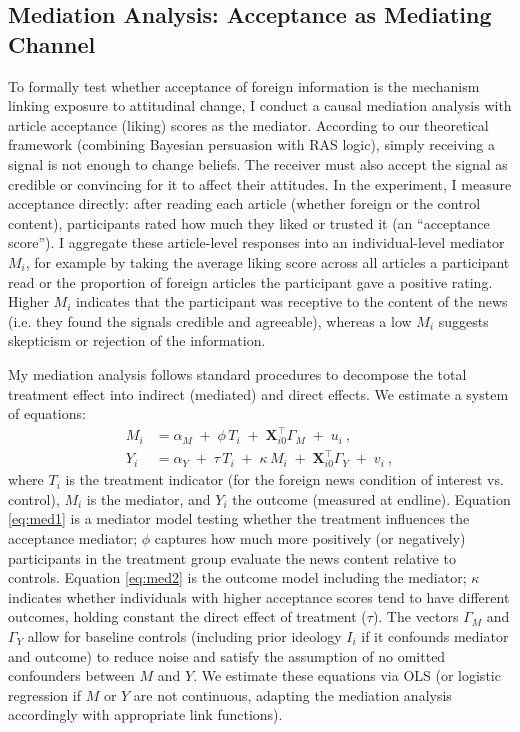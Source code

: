 \documentclass[12pt, american]{article}
\begin{document}
\subsection{Mediation Analysis: Acceptance as Mediating Channel}
To formally test whether acceptance of foreign information is the mechanism linking exposure to attitudinal change, I conduct a causal mediation analysis with article acceptance (liking) scores as the mediator. According to our theoretical framework (combining Bayesian persuasion with RAS logic), simply receiving a signal is not enough to change beliefs. The receiver must also accept the signal as credible or convincing for it to affect their attitudes. In the experiment, I measure acceptance directly: after reading each article (whether foreign or the control content), participants rated how much they liked or trusted it (an “acceptance score”). I aggregate these article-level responses into an individual-level mediator $M_i$, for example by taking the average liking score across all articles a participant read or the proportion of foreign articles the participant gave a positive rating. Higher $M_i$ indicates that the participant was receptive to the content of the news (i.e. they found the signals credible and agreeable), whereas a low $M_i$ suggests skepticism or rejection of the information.

My mediation analysis follows standard procedures \citep[e.g.,][]{imai2010causal} to decompose the total treatment effect into indirect (mediated) and direct effects. We estimate a system of equations:
\begin{align}
M_i &= \alpha_M \;+\; \phi\,T_i \;+\; \mathbf{X}_{i0}^{\top}\Gamma_M \;+\; u_i~, \label{eq:med1}\\
Y_i &= \alpha_Y \;+\; \tau\,T_i \;+\; \kappa\,M_i \;+\; \mathbf{X}_{i0}^{\top}\Gamma_Y \;+\; v_i~, \label{eq:med2}
\end{align}
where $T_i$ is the treatment indicator (for the foreign news condition of interest vs. control), $M_i$ is the mediator, and $Y_i$ the outcome (measured at endline). Equation \eqref{eq:med1} is a mediator model testing whether the treatment influences the acceptance mediator; $\phi$ captures how much more positively (or negatively) participants in the treatment group evaluate the news content relative to controls. Equation \eqref{eq:med2} is the outcome model including the mediator; $\kappa$ indicates whether individuals with higher acceptance scores tend to have different outcomes, holding constant the direct effect of treatment ($\tau$). The vectors $\Gamma_M$ and $\Gamma_Y$ allow for baseline controls (including prior ideology $I_i$ if it confounds mediator and outcome) to reduce noise and satisfy the assumption of no omitted confounders between $M$ and $Y$. We estimate these equations via OLS (or logistic regression if $M$ or $Y$ are not continuous, adapting the mediation analysis accordingly with appropriate link functions).
\end{document}

